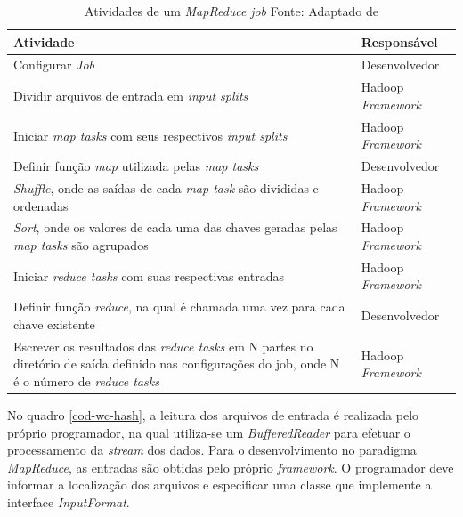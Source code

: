 \begin{table}[!ht]
\begin{center}
  \begin{tabular}{|p{5cm}|p{5cm}|}
	\hline
	Atividade & Responsável	
	\\ \hline
	Configurar \textit{Job} & Desenvolvedor
	\\ \hline
	Dividir arquivos de entrada em \textit{input splits} & Hadoop \textit{Framework}
	\\ \hline
	Iniciar \textit{map tasks} com seus respectivos \textit{input splits} & Hadoop \textit{Framework}
	\\ \hline
	Definir função \textit{map} utilizada pelas \textit{map tasks} & Desenvolvedor
	\\ \hline
	\textit{Shuffle}, onde as saídas de cada \textit{map task} são divididas e ordenadas & Hadoop \textit{Framework}
	\\ \hline
	\textit{Sort}, onde os valores de cada uma das chaves geradas pelas \textit{map tasks} são agrupados & Hadoop \textit{Framework}
	\\ \hline
	Iniciar \textit{reduce tasks} com suas respectivas entradas & Hadoop \textit{Framework}
	\\ \hline
	Definir função \textit{reduce}, na qual é chamada uma vez para cada chave existente & Desenvolvedor
	\\ \hline
	Escrever os resultados das \textit{reduce tasks} em N partes no diretório de saída definido nas configurações do job, onde N é o número de \textit{reduce tasks} & Hadoop \textit{Framework}
	\\ \hline
  \end{tabular}
  \captionsetup{justification=centering}
  \caption[Atividades de um \textit{MapReduce} \textit{job}]{Atividades de um \textit{MapReduce} \textit{job}
  \protect\linebreak Fonte: Adaptado de \cite{venner2009}}
\label{tab-mapreduce-job}
\end{center}
\end{table}
\FloatBarrier

No quadro \ref{cod-wc-hash}, a leitura dos arquivos de entrada é realizada pelo próprio programador, na qual utiliza-se um \textit{BufferedReader} para efetuar o processamento da \textit{stream} dos dados. Para o desenvolvimento no paradigma \textit{MapReduce}, as entradas são obtidas pelo próprio \textit{framework}. O programador deve informar a localização dos arquivos e especificar uma classe que implemente a interface \textit{InputFormat}. 

